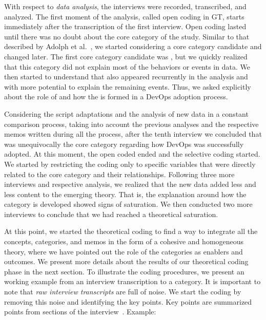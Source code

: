 With respect to \emph{data analysis}, the interviews were
recorded, transcribed, and analyzed. The first moment
of the analysis, called open coding in GT, starts immediately after the
transcription of the first interview.
Open coding lasted until there was no
doubt about the core category of the study. Similar to that described by
Adolph et al.~\cite{adolph2012reconciling}, we started
considering a core category candidate and changed later. The first core category
candidate was , but we quickly realized that this category did not
explain most of the behaviors
or events in data. We then started to understand that
\cc also appeared recurrently in the analysis and with more
potential to explain the remaining events. Thus, we asked explicitly
about the role of  and how the \cc is formed
in a DevOps adoption process.

Considering the script adaptations and the analysis of new data in a constant
comparison process, taking into account the previous analyses and the
respective memos written during all the process, after the tenth
interview we concluded that \cc was unequivocally the core
category regarding how DevOps was successfully adopted.
At this moment, the open coded ended and the selective coding started.
We started by restricting the coding only
to specific variables that were directly related to the core category and their
relationships. Following three more interviews and respective analysis, we realized that
the new data added less and less content to the emerging theory. That is, the
explanation around how the \cc category is developed showed signs of saturation.
We then conducted two more interviews to conclude that we had reached a
theoretical saturation.

At this point, we started the theoretical coding to find a way to integrate
all the concepts, categories, and memos in the form of a cohesive and
homogeneous theory, where we have pointed out the role of the categories as
enablers and outcomes. We present more details about
the results of our theoretical coding phase in the next section.
To illustrate the coding procedures, we present an working example from an
interview transcription to a category.
It is important to note that \emph{raw interview transcripts} are full of noise.
We start the coding by removing this noise and identifying the key points.
Key points are summarized points from sections of the interview~\cite{georgieva2008best}. Example:

